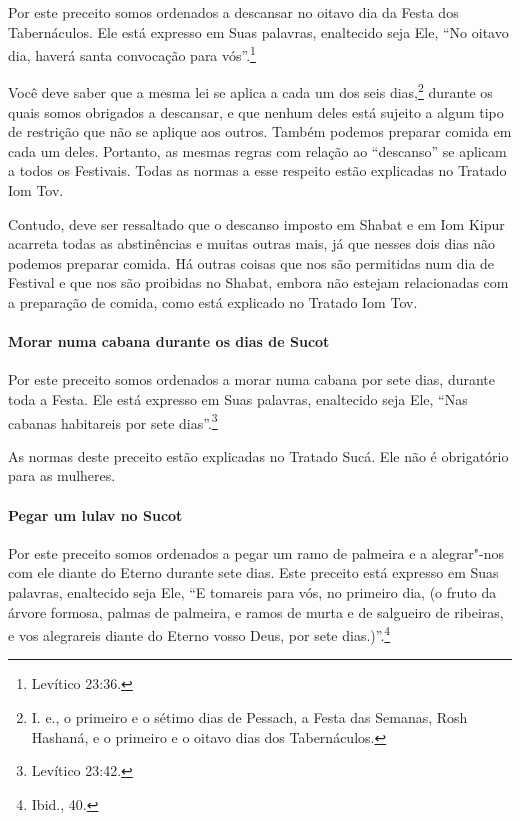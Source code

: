 \begin{multicols}{2}
Por este preceito somos ordenados a descansar no oitavo dia da Festa
dos Tabernáculos. Ele está expresso em Suas palavras, enaltecido seja
Ele, ``No oitavo dia, haverá santa convocação para vós''.\footnote{Levítico 23:36.}

Você deve saber que a mesma lei se aplica a cada um dos seis
dias,\footnote{I. e., o primeiro e o sétimo dias de Pessach\starr, a Festa das
Semanas, Rosh Hashaná\starr, e o primeiro e o oitavo dias dos Tabernáculos.} durante os quais somos obrigados a
descansar, e que nenhum deles está sujeito a algum tipo de restrição que não se aplique aos outros. Também podemos preparar comida em cada um deles. Portanto, as mesmas regras com relação ao ``descanso'' se aplicam a todos os Festivais. Todas as normas a esse
respeito estão explicadas no Tratado Iom Tov\starr.

Contudo, deve ser ressaltado que o descanso imposto em Shabat e em Iom
Kipur\starr{} acarreta todas as abstinências e muitas outras mais, já que
nesses dois dias não podemos preparar comida. Há outras coisas que nos
são permitidas num dia de Festival e que nos são proibidas no Shabat,
embora não estejam relacionadas com a preparação de comida, como está
explicado no Tratado Iom Tov\starr.

\paragraph{Morar numa cabana durante os dias de Sucot\starr}

Por este preceito somos ordenados a morar numa cabana por sete dias,
durante toda a Festa. Ele está expresso em Suas palavras, enaltecido
seja Ele, ``Nas cabanas habitareis por sete dias''.\footnote{Levítico 23:42.}

As normas deste preceito estão explicadas no Tratado Sucá\starr. Ele não é
obrigatório para as mulheres.

\paragraph{Pegar um lulav\starr{} no Sucot\starr}

Por este preceito somos ordenados a pegar um ramo de palmeira e a
alegrar"-nos com ele diante do Eterno durante sete dias. Este preceito
está expresso em Suas palavras, enaltecido seja Ele, ``E tomareis para
vós, no primeiro dia, (o fruto da árvore formosa, palmas de palmeira, e
ramos de murta e de salgueiro de ribeiras, e vos alegrareis diante do
Eterno vosso Deus, por sete dias.)''.\footnote{Ibid., 40.}


\end{multicols}
